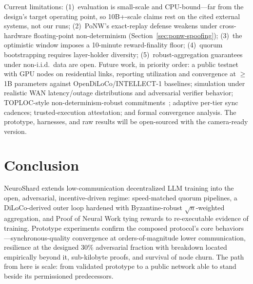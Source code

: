\documentclass[conference]{IEEEtran}
\begin{document}
Current limitations: (1)~evaluation is small-scale and CPU-bound---far from the design's target operating point, so 10B+-scale claims rest on the cited external systems, not our runs; (2)~PoNW's exact-replay defense weakens under cross-hardware floating-point non-determinism (Section~\ref{sec:ponw-spoofing}); (3)~the optimistic window imposes a 10-minute reward-finality floor; (4)~quorum bootstrapping requires layer-holder diversity; (5)~robust-aggregation guarantees under non-i.i.d.\ data are open. Future work, in priority order: a public testnet with GPU nodes on residential links, reporting utilization and convergence at $\geq$1B parameters against OpenDiLoCo/INTELLECT-1 baselines; simulation under realistic WAN latency/outage distributions and adversarial verifier behavior; TOPLOC-style non-determinism-robust commitments~\cite{ong2025toploc}; adaptive per-tier sync cadences; trusted-execution attestation; and formal convergence analysis. The prototype, harnesses, and raw results will be open-sourced with the camera-ready version.

\section{Conclusion}

NeuroShard extends low-communication decentralized LLM training into the open, adversarial, incentive-driven regime: speed-matched quorum pipelines, a DiLoCo-derived outer loop hardened with Byzantine-robust $\sqrt{n}$-weighted aggregation, and Proof of Neural Work tying rewards to re-executable evidence of training. Prototype experiments confirm the composed protocol's core behaviors---synchronous-quality convergence at orders-of-magnitude lower communication, resilience at the designed 30\% adversarial fraction with breakdown located empirically beyond it, sub-kilobyte proofs, and survival of node churn. The path from here is scale: from validated prototype to a public network able to stand beside its permissioned predecessors.


\end{document}
